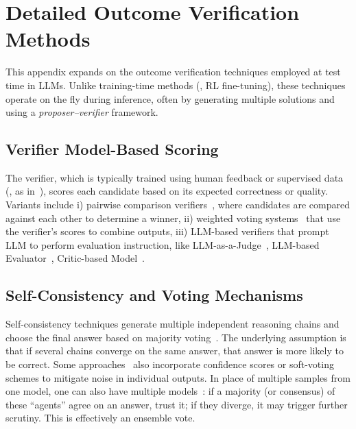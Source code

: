 
\section{Detailed Outcome Verification Methods}
\label{app:outcome_verification}

This appendix expands on the outcome verification techniques employed at test time in LLMs. Unlike training-time methods (\eg, RL fine-tuning), these techniques operate on the fly during inference, often by generating multiple solutions and using a \textit{proposer–verifier} framework.

\subsection{Verifier Model-Based Scoring}
The verifier, which is typically trained using human feedback or supervised data (\eg, as in~\cite{cobbe2021training,lambert2024rewardbenchevaluatingrewardmodels}), scores each candidate based on its expected correctness or quality. Variants include i) pairwise comparison verifiers~\citep{liu2025pairjudgermperformbestofn}, where candidates are compared against each other to determine a winner, ii) weighted voting systems~\citep{wettig2024quratingselectinghighqualitydata,li2024dnaevalenhancinglargelanguage} that use the verifier’s scores to combine outputs, iii) LLM-based verifiers that prompt LLM to perform evaluation instruction, like LLM-as-a-Judge~\citep{NEURIPS2023_91f18a12,zhang2025crowd,zhang2025reviseval}, LLM-based Evaluator~\citep{liu2023gevalnlgevaluationusing,xu2023instructscore,jiang2024tigerscorebuildingexplainablemetric}, Critic-based Model~\citep{gao2024llmcriticshelpcatch,mcaleese2024llmcriticshelpcatch}.

\subsection{Self-Consistency and Voting Mechanisms}
Self-consistency techniques generate multiple independent reasoning chains and choose the final answer based on majority voting~\cite{wang2023selfconsistency}. The underlying assumption is that if several chains converge on the same answer, that answer is more likely to be correct. Some approaches~\citep{taubenfeld2025confidenceimprovesselfconsistencyllms,mahmud2025enhancingllmcodegeneration} also incorporate confidence scores or soft-voting schemes to mitigate noise in individual outputs. In place of multiple samples from one model, one can also have multiple models~\citep{wan2025mammrefinerecipeimprovingfaithfulness,wu2025hiddenstrengthdisagreementunraveling,wang2025talkstructurallyacthierarchically,feng2024diverseagententropyquantifyingblackboxllm,chen2024reconcileroundtableconferenceimproves}: if a majority (or consensus) of these ``agents'' agree on an answer, trust it; if they diverge, it may trigger further scrutiny. This is effectively an ensemble vote. 


